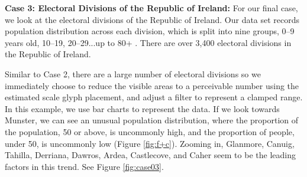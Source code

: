 \textbf{Case 3: Electoral Divisions of the Republic of Ireland: } \label{sec:case03}
For our final case, we look at the electoral divisions of the Republic of Ireland. Our data set records population distribution across each division, which is split into nine groups, 0--9 years old, 10--19, 20--29...up to 80+ \cite{electoralDivisions}. There are over 3,400 electoral divisions in the Republic of Ireland.

Similar to Case 2, there are a large number of electoral divisions so we immediately choose to reduce the visible areas to a perceivable number using the estimated scale glyph placement, and adjust a filter to represent a clamped range. In this example, we use bar charts to represent the data. If we look towards Munster, we can see an unusual population distribution, where the proportion of the population, 50 or above, is uncommonly high, and the proportion of people, under 50, is uncommonly low (Figure \ref{fig:f+c}). Zooming in, Glanmore, Canuig, Tahilla, Derriana, Dawros, Ardea, Castlecove, and Caher seem to be the leading factors in this trend. See Figure \ref{fig:case03}.



